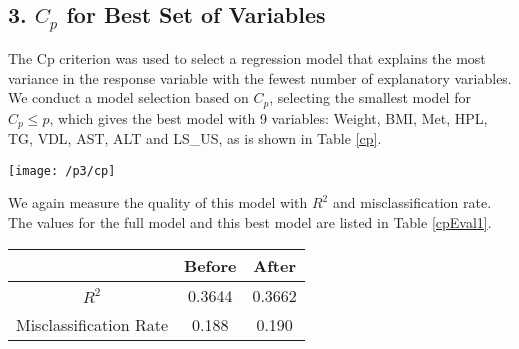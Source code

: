 \documentclass{article}
\begin{document}
%


\subsection{3. $C_p$ for Best Set of Variables}
The Cp criterion was used to select a regression model that explains the most variance in the response variable with the fewest number of explanatory variables. We conduct a model selection based on $C_p$, selecting the smallest model for $C_p \leq p$, which gives the best model with 9 variables: Weight, BMI, Met, HPL, TG, VDL, AST, ALT and LS\_US, as is shown in Table \ref{cp}.

\begin{minipage}{\textwidth}
	 \label{cp}		
	\centering
	\texttt{[image: /p3/cp]}
\end{minipage} \hfill

We again measure the quality of this model with $R^2$ and misclassification rate. The values for the full model and this best model are listed in Table \ref{cpEval1}. \\

\begin{minipage}{\textwidth}
	\centering
	 \label{cpEval1}
	\begin{tabular}{c | c | c}
	\hline
	& Before & After\\
	\hline
	$R^2$ & 0.3644 & 0.3662 \\
	\hline
	Misclassification Rate & 0.188 & 0.190\\
	\hline
	\end{tabular}
\end{minipage} \hfill
\end{document}
